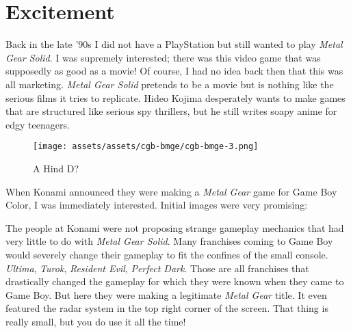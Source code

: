 \documentclass{book}
\let\oldcenter\center
\let\oldendcenter\endcenter
\renewenvironment{center}{\setlength\topsep{0pt}\oldcenter}{\oldendcenter}
\begin{document}
\FloatBarrier\needspace{10mm}\section*{Excitement}\nopagebreak[4]

Back in the late ’90s I did not have a PlayStation but still wanted to play \emph{Metal Gear Solid}. I was supremely interested; there was this video game that was supposedly as good as a movie! Of course, I had no idea back then that this was all marketing. \emph{Metal Gear Solid} pretends to be a movie but is nothing like the serious films it tries to replicate. Hideo Kojima desperately wants to make games that are structured like serious spy thrillers, but he still writes soapy anime for edgy teenagers.

\begin{figure}[hbt]
\vskip 10pt
\centering \texttt{[image: assets/assets/cgb-bmge/cgb-bmge-3.png]}\par\pagetwodescription A Hind D?
\vskip 6pt
\end{figure}

When Konami announced they were making a \emph{Metal Gear} game for Game Boy Color, I was immediately interested. Initial images were very promising:

\begin{center}
\quad\vspace{4pt}
\quad\vspace{4pt}
\quad\vspace{4pt}
\end{center}

The people at Konami were not proposing strange gameplay mechanics that had very little to do with \emph{Metal Gear Solid}. Many franchises coming to Game Boy would severely change their gameplay to fit the confines of the small console. \emph{Ultima}, \emph{Turok}, \emph{Resident Evil}, \emph{Perfect Dark}. Those are all franchises that drastically changed the gameplay for which they were known when they came to Game Boy. But here they were making a legitimate \emph{Metal Gear} title. It even featured the radar system in the top right corner of the screen. That thing is really small, but you do use it all the time!
\end{document}
